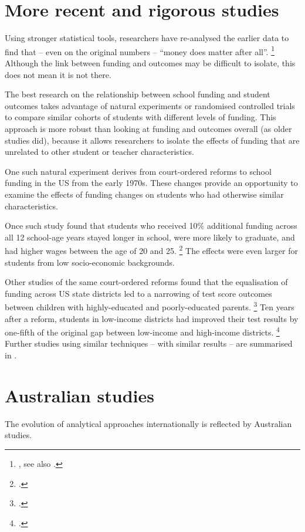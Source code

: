 \documentclass{grattan}
\begin{document}
\section{More recent and rigorous studies}
Using stronger statistical tools, researchers have re-analysed the earlier data to find that -- even on the original numbers -- ``money does matter after all''.%
\footnote{\textcite[][13]{Hedges1994ExchangePartI}, see also \textcites{Krueger2003EconomicConsiderationsClass}{Konstantopoulos2011FamilyBackgroundSchool}.}
Although the link between funding and outcomes may be difficult to isolate, this does not mean it is not there.

The best research on the relationship between school funding and student outcomes takes advantage of natural experiments or randomised controlled trials to compare similar cohorts of students with different levels of funding.
This approach is more robust than looking at funding and outcomes overall (as older studies did), because it allows researchers to isolate the effects of funding that are unrelated to other student or teacher characteristics.

One such natural experiment derives from court-ordered reforms to school funding in the US from the early 1970s.
These changes provide an opportunity to examine the effects of funding changes on students who had otherwise similar characteristics.

Once such study found that students who received 10\% additional funding across all 12 school-age years stayed longer in school, were more likely to graduate, and had higher wages between the age of 20 and 25.%
\footcite{Jackson2016EffectsSchoolSpending} The effects were even larger for students from low socio-economic backgrounds.

Other studies of the same court-ordered reforms found that the equalisation of funding across US state districts led to a narrowing of test score outcomes between children with highly-educated and poorly-educated parents.%
\footcite[][80]{Card2002Schoolfinancereform} Ten years after a reform, students in low-income districts had improved their test results by one-fifth of the original gap between low-income and high-income districts.%
\footcite{Lafortune2016SchoolFinanceReform}
Further studies using similar techniques -- with similar results -- are summarised in
.



\section{Australian studies}\label{sec:australian-studies}
The evolution of analytical approaches internationally is reflected by Australian studies.
\end{document}
